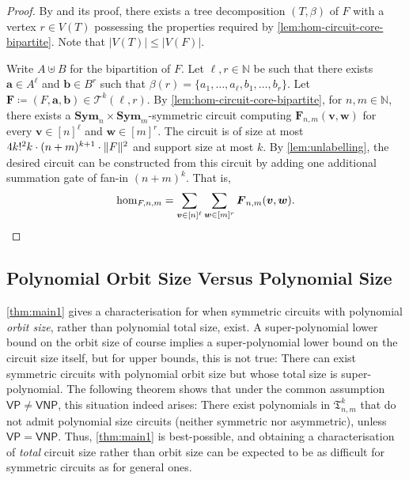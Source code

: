 \documentclass[11pt, DIV=15]{scrarticle}
\theoremstyle{definition}
\theoremstyle{plain}
\theoremstyle{remark}
\DeclarePairedDelimiter{\norm}{\lVert}{\rVert}
\newcommand{\Sym}{\mathbf{Sym}}
\newcommand{\VP}{\mathsf{VP}}
\newcommand{\VNP}{\mathsf{VNP}}
\begin{document}
 	\thmHomCircuit*
 	\begin{proof}
 		By \cite[Lemma~6]{seppelt_algorithmic_2024} and its proof, 
 		there exists a tree decomposition $(T, \beta)$ of $F$ with a vertex $r \in V(T)$ possessing the properties required by \cref{lem:hom-circuit-core-bipartite}.
 		Note that $|V(T)| \leq |V(F)|$.
 		
 		Write $A \uplus B$ for the bipartition of $F$.
 		Let $\ell, r \in \mathbb{N}$ be such that there exists $\boldsymbol{a} \in A^\ell$ and $\boldsymbol{b} \in B^r$ such that $\beta(r) = \{a_1, \dots, a_\ell, b_1, \dots, b_r\}$.
 		Let $\boldsymbol{F} \coloneqq (F, \boldsymbol{a}, \boldsymbol{b}) \in \mathcal{T}^k(\ell, r)$.
 		By \cref{lem:hom-circuit-core-bipartite}, 
 		for $n,m \in \mathbb{N}$,
 		there exists a $\Sym_n \times \Sym_m$-symmetric circuit computing $\boldsymbol{F}_{n,m}(\boldsymbol{v}, \boldsymbol{w})$
 		for every $\boldsymbol{v} \in [n]^\ell$ and $\boldsymbol{w} \in [m]^r$.
 		The circuit is of size at most $4 k!^2 k \cdot (n+m)^{k+1} \cdot \norm{F}^2$ and support size at most $k$.
 		By \cref{lem:unlabelling}, the desired circuit can be constructed from this circuit by adding one additional summation gate of fan-in $(n+m)^k$.
 		That is,
 		\[
 			\hom_{F, n,m} = \sum_{\boldsymbol{v} \in [n]^\ell} \sum_{\boldsymbol{w} \in [m]^r} \boldsymbol{F}_{n,m}(\boldsymbol{v}, \boldsymbol{w}). \qedhere
 		\]
 	\end{proof}
 	
	
	\subsection{Polynomial Orbit Size Versus Polynomial Size}
	
	\cref{thm:main1} gives a characterisation for when symmetric circuits with polynomial \emph{orbit size}, rather than polynomial total size, exist. A super-polynomial lower bound on the orbit size of course implies a super-polynomial lower bound on the circuit size itself, but for upper bounds, this is not true: There can exist symmetric circuits with polynomial orbit size but whose total size is super-polynomial. The following theorem shows that under the common assumption $\VP \neq \VNP$, this situation indeed arises: There exist polynomials in $\mathfrak{T}_{n,m}^k$ that do not admit polynomial size circuits (neither symmetric nor asymmetric), unless $\VP = \VNP$. Thus, \cref{thm:main1} is best-possible, and obtaining a characterisation of \emph{total} circuit size rather than orbit size can be expected to be as difficult for symmetric circuits as for general ones.
	
\end{document}
